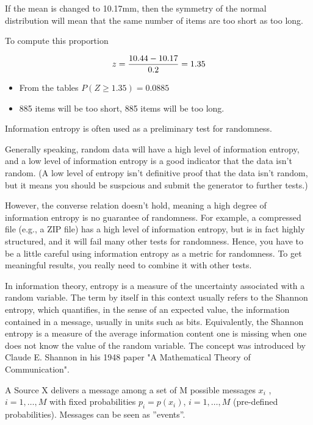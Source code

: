 ﻿\documentclass[a4]{beamer}
\begin{document}
\begin{frame}
If the mean is changed to 10.17mm, then the symmetry of the normal distribution will mean that the same number of items are too short as too long.

To compute this proportion

\[ z = {10.44 - 10.17 \over 0.2} = 1.35 \]

\begin{itemize}
\item From the tables $P(Z \geq 1.35) = 0.0885$

\item 885 items will be too short, 885 items will be too long.
\end{itemize}
\end{frame}





\begin{frame}
Information entropy is often used as a preliminary test for randomness. 


Generally speaking, random data will have a high level of information entropy, and a low level of information entropy is a 
good indicator that the data isn't random. 
(A low level of entropy isn't definitive proof that the data isn't random, but it means you should be suspcious and submit the generator to further tests.)


However, the converse relation doesn't hold, meaning a high degree of 
information entropy is no guarantee of randomness. 
For example, a compressed file (e.g., a ZIP file) has a high level of information entropy, but is 
in fact highly structured, and it will fail many other tests for randomness. 
Hence, you have to be a little careful using information entropy as a metric for randomness. 
To get meaningful results, you really need to combine it with other tests.
\end{frame}






\begin{frame}
In information theory, entropy is a measure of the uncertainty associated with a random variable. 
The term by itself in this context usually refers to the Shannon entropy, which quantifies, in the 
sense of an expected value, the information contained in a message, usually in units such as bits. 
Equivalently, the Shannon entropy is a measure of the average information content one is missing 
when one does not know the value of the random variable. 
The concept was introduced by Claude E. Shannon in his 1948 paper "A Mathematical Theory of Communication".


A Source X delivers a message among a set of M possible messages $x_i$ , $i = 1, \ldots ,M$
with fixed probabilities $p_i = p(x_i)$,  $i = 1, \ldots ,M$ (pre-defined probabilities).
Messages can be seen as ”events”.
\end{frame}
\end{document}
